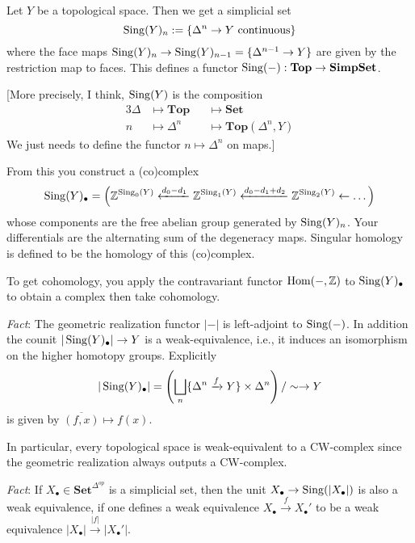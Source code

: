 \documentclass[class=report, crop=false,a4paper,twoside]{standalone}
\begin{document}
\begin{definition}
	Let $Y$ be a topological space. Then we get a simplicial set 
	\[
	\operatorname{Sing}(Y)_n := \{\Delta^n \to Y \text{ continuous}\}
	\]
	where the face maps $\operatorname{Sing}(Y)_n \to \operatorname{Sing}(Y)_{n-1} = \{\Delta^{n-1} \to Y\}$ are given by the restriction map to faces. This defines a functor $\operatorname{Sing}(-): \mathbf{Top} \to \mathbf{SimpSet}$. 

	[More precisely, I think, $\operatorname{Sing}(Y)$ is the composition
	\begin{alignat*}{3}
		\Delta &\mapsto \mathbf{Top} &&\mapsto \mathbf{Set}\\
		n &\mapsto \Delta^n &&\mapsto \mathbf{Top}(\Delta^n,Y)
	\end{alignat*}
	We just needs to define the functor $n \mapsto \Delta^n$ on maps.]
\end{definition}

\begin{remark}
	From this you construct a (co)complex 
	\[
	\operatorname{Sing}(Y)_\bullet = \left(\mathbb{Z}^{\operatorname{Sing}_0(Y)} \xleftarrow{d_0 - d_1} \mathbb{Z}^{\operatorname{Sing}_1(Y)} \xleftarrow{d_0 - d_1 + d_2} \mathbb{Z}^{\operatorname{Sing}_2(Y)} \leftarrow \dots\right)
	\]
	whose components are the free abelian group generated by $\operatorname{Sing}(Y)_n$. Your differentials are the alternating sum of the degeneracy maps. Singular homology is defined to be the homology of this (co)complex.

	To get cohomology, you apply the contravariant functor $\operatorname{Hom}(-,\mathbb{Z})$ to $\operatorname{Sing}(Y)_\bullet$ to obtain a complex then take cohomology.
\end{remark}

\emph{Fact}: The geometric realization functor $|-|$ is left-adjoint to $\operatorname{Sing}(-)$. In addition the counit $|\operatorname{Sing}(Y)_\bullet| \to Y$ is a weak-equivalence, i.e., it induces an isomorphism on the higher homotopy groups.
Explicitly
\[
|\operatorname{Sing}(Y)_\bullet| = \left(\bigsqcup_n \{\Delta^n \xrightarrow{f} Y\} \times \Delta^n\right)/\sim \to Y
\]
is given by $\overline{(f,x)} \mapsto f(x)$.

In particular, every topological space is weak-equivalent to a CW-complex since the geometric realization always outputs a CW-complex. 

\emph{Fact}: If $X_\bullet \in \mathbf{Set}^{\Delta^{op}}$ is a simplicial set, then the unit $X_\bullet \to \operatorname{Sing}(|X_\bullet|)$ is also a weak equivalence, if one defines a weak equivalence $X_\bullet \xrightarrow{f} X_\bullet'$ to be a weak equivalence $|X_\bullet| \xrightarrow{|f|} |X_\bullet'|$. 
\end{document}
